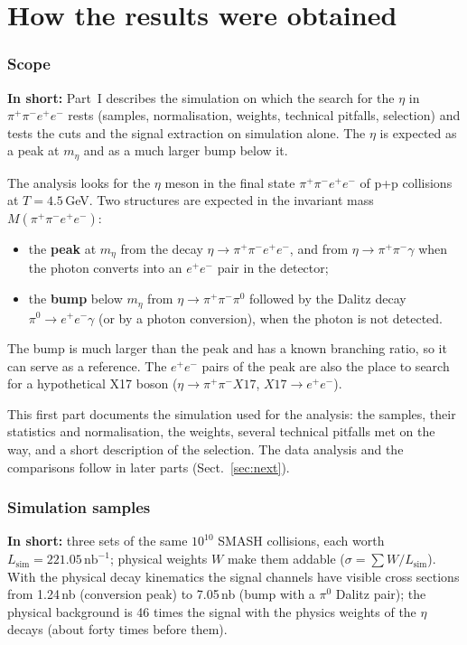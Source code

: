 \documentclass[11pt,a4paper]{article}
\newcommand{\piz}{\ensuremath{\pi^{0}}\xspace}
\newcommand{\ee}{\ensuremath{e^{+}e^{-}}\xspace}
\newcommand{\pipi}{\ensuremath{\pi^{+}\pi^{-}}\xspace}
\newcommand{\ppee}{\ensuremath{\pi^{+}\pi^{-}e^{+}e^{-}}\xspace}
\newcommand{\Mfour}{\ensuremath{M(\pi^{+}\pi^{-}e^{+}e^{-})}\xspace}
\newcommand{\nbinv}{\ensuremath{\mathrm{nb}^{-1}}\xspace}
\newcommand{\Lsim}{\ensuremath{L_{\mathrm{sim}}}\xspace}
\newcommand{\inshort}[1]{\par\noindent\colorbox{black!5}{\parbox{\dimexpr\linewidth-2\fboxsep\relax}{\textbf{In short:} #1}}\par}
\begin{document}
\part*{How the results were obtained}

\section{Scope}
\label{sec:scope}
\inshort{Part~I describes the simulation on which the search for the $\eta$ in \ppee rests (samples, normalisation,
weights, technical pitfalls, selection) and tests the cuts and the signal extraction on simulation alone. The $\eta$ is
expected as a peak at $m_\eta$ and as a much larger bump below it.}

The analysis looks for the $\eta$ meson in the final state $\ppee$ of p+p collisions at
$T = 4.5$\,GeV. Two structures are expected in the invariant mass $\Mfour$:
\begin{itemize}
\item the \textbf{peak} at $m_\eta$ from the decay $\eta\to\ppee$, and from
      $\eta\to\pipi\gamma$ when the photon converts into an \ee pair in the detector;
\item the \textbf{bump} below $m_\eta$ from $\eta\to\pipi\piz$ followed by the Dalitz decay
      $\piz\to\ee\gamma$ (or by a photon conversion), when the photon is not detected.
\end{itemize}
The bump is much larger than the peak and has a known branching ratio, so it can serve as a
reference. The \ee pairs of the peak are also the place to search for a hypothetical X17
boson ($\eta\to\pipi X17$, $X17\to\ee$).

This first part documents the simulation used for the analysis: the samples, their
statistics and normalisation, the weights, several technical pitfalls met on the way, and a
short description of the selection. The data analysis and the comparisons follow in later
parts (Sect.~\ref{sec:next}).

\section{Simulation samples}
\label{sec:samples}
\inshort{three sets of the same $10^{10}$ SMASH collisions, each worth $\Lsim = 221.05\,\nbinv$; physical weights $W$
make them addable ($\sigma = \sum W/\Lsim$). With the physical decay kinematics the signal channels have visible cross
sections from 1.24\,nb (conversion peak) to 7.05\,nb (bump with a \piz Dalitz pair); the physical background is
46 times the signal with the physics weights of the $\eta$ decays (about forty times before them).}
\end{document}
